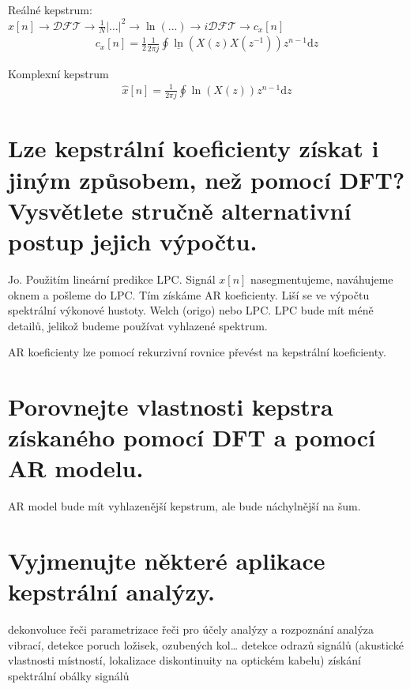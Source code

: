 \documentclass[a4paper,12pt]{article}   %
\newcommand{\mt}[1]{$#1$}
\newcommand{\dd}{\text{d}}
\begin{document}
Reálné kepstrum:\\
\mt{x[n] \rightarrow \mathscr{DFT} \rightarrow \frac{1}{N}|\dots|^2 \rightarrow \ln (...) \rightarrow i\mathscr{DFT} \rightarrow c_x[n]}
\begin{align*}
        c_x[n] = \frac{1}{2}\frac{1}{2\pi j}\oint \underline{\ln}(X(z)X(z^{-1}))z^{n-1}\dd z
\end{align*}



Komplexní kepstrum
\begin{align*}
        \hat{x}[n] = \frac{1}{2\pi j}\oint \ln(X(z))z^{n-1}\dd z
\end{align*}




\section{Lze kepstrální koeficienty získat i jiným způsobem, než pomocí DFT? Vysvětlete stručně alternativní postup jejich výpočtu.}

Jo. Použitím lineární predikce LPC. Signál \mt{x[n]} nasegmentujeme, naváhujeme oknem a pošleme do LPC. Tím získáme AR koeficienty. Liší se ve výpočtu spektrální výkonové hustoty. Welch (origo) nebo LPC. LPC bude mít méně detailů, jelikož budeme používat vyhlazené spektrum. 

AR koeficienty lze pomocí rekurzivní rovnice převést na kepstrální koeficienty. 


\section{Porovnejte vlastnosti kepstra získaného pomocí DFT a pomocí AR modelu.}

AR model bude mít vyhlazenější kepstrum, ale bude náchylnější na šum.


\section{Vyjmenujte některé aplikace kepstrální analýzy.}
\begin{outline}
        \1 dekonvoluce řeči
        \1 parametrizace řeči pro účely analýzy a rozpoznání
        \1 analýza vibrací, detekce poruch ložisek, ozubených kol\dots
        \1 detekce odrazů signálů (akustické vlastnosti místností, lokalizace diskontinuity na optickém kabelu)
        \1 získání spektrální obálky signálů
\end{outline}
\end{document}
